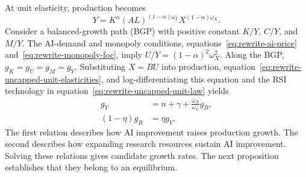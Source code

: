 At unit elasticity, production becomes
\begin{equation}
 Y=K^\alpha(AL)^{(1-\alpha)\omega_L}X^{(1-\alpha)\omega_X}.
 \label{eq:rewrite-uncapped-unit-elasticities}
\end{equation}
Consider a balanced-growth path (BGP) with positive constant $K/Y$, $C/Y$,
and $M/Y$. The AI-demand and
monopoly conditions, equations~\eqref{eq:rewrite-ai-price}
and~\eqref{eq:rewrite-monopoly-foc}, imply $U/Y=(1-\alpha)^2\omega_X^2$.
Along the BGP, $g_K=g_U=g_M=g_Y$. Substituting $X=BU$ into production,
equation~\eqref{eq:rewrite-uncapped-unit-elasticities}, and log-differentiating
this equation and the RSI technology in equation~\eqref{eq:rewrite-uncapped-unit-law}
yields
\begin{align}
 g_Y&=n+\gamma+\frac{\omega_X}{\omega_L}g_B,
 \label{eq:rewrite-uncapped-unit-production-growth}\\
 (1-\eta)g_B&=\eta g_Y.
 \label{eq:rewrite-uncapped-unit-research-growth}
\end{align}
The first relation describes how AI improvement raises production growth.
The second describes how expanding research resources sustain AI improvement.
Solving these relations gives candidate growth rates. The next proposition
establishes that they belong to an equilibrium.

